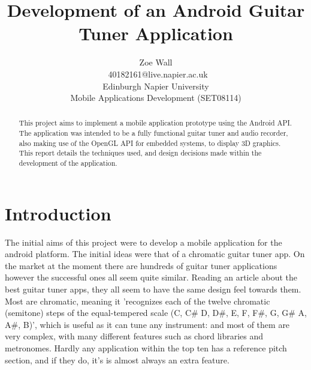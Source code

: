 \documentclass[conference]{acmsiggraph}
\title{Development of an Android Guitar Tuner Application}
\author{Zoe Wall \\\ 40182161@live.napier.ac.uk \\
Edinburgh Napier University \\
Mobile Applications Development (SET08114)}
\newcommand{\figuremacroW}[4]{
	\begin{figure}[h] %
		\centering
		\texttt{[image: \#1]}
		\caption[#2]{\textbf{#2} - #3}
		\label{fig:#1}
	\end{figure}
}
\begin{document}

\maketitle

\begin{abstract} %
This project aims to implement a mobile application prototype using the Android API. The application was intended to be a fully functional guitar tuner and audio recorder, also making use of the OpenGL API for embedded systems, to display 3D graphics. This report details the techniques used, and design decisions made within the development of the application.
\end{abstract}

\keywordlist




\section{Introduction}

The initial aims of this project were to develop a mobile application for the android platform. The initial ideas were that of a chromatic guitar tuner app. On the market at the moment there are hundreds of guitar tuner applications however the successful ones all seem quite similar. Reading an article about the best guitar tuner apps, they all seem to have the same design feel towards them. \cite{bestApps} Most are chromatic, meaning it 'recognizes each of the twelve chromatic (semitone) steps of the equal-tempered scale (C, C\# D, D\#, E, F, F\#, G, G\# A, A\#, B)', \cite{Roland} which is useful as it can tune any instrument: and most of them are very complex, with many different features such as chord libraries and metronomes. Hardly any application within the top ten has a reference pitch section, and if they do, it's is almost always an extra feature. %
\end{document}
